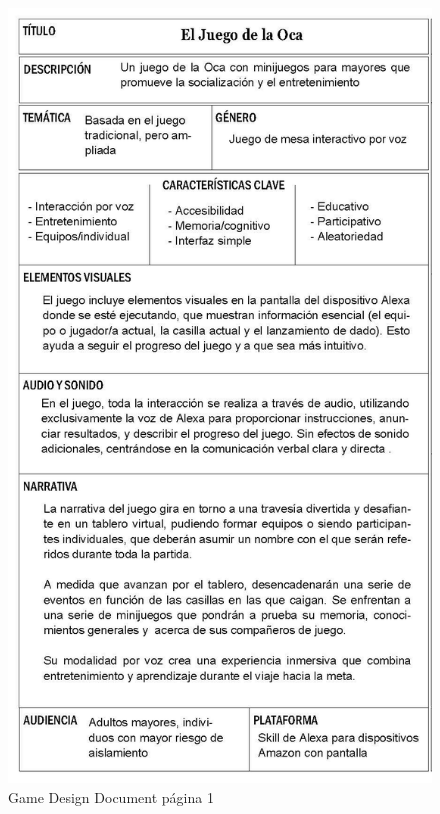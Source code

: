 \begin{figure}[H]
	\centering
	\includegraphics{imgs/GDD-1.jpg}
	\caption{Game Design Document página 1}
	\label{fig:GDD-1}
\end{figure}

